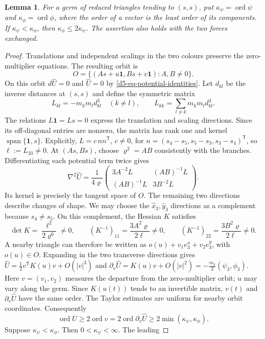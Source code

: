 \documentclass[11pt]{amsart}
\newtheorem{lemma}[theorem]{Lemma}
\theoremstyle{definition}
\theoremstyle{remark}
\newcommand{\ord}{\operatorname{ord}}
\begin{document}
{\begin{lemma}\label{d5-lem-mb}
For a germ of reduced triangles tending to $(s,s)$, put
$\kappa_\psi=\ord\psi$ and $\kappa_\phi=\ord\phi$, where the order of a vector is
the least order of its components.  If $\kappa_\psi<\kappa_\phi$, then
$\kappa_\phi\le2\kappa_\psi$.  The assertion also holds with the two forces
exchanged.
\end{lemma}
\begin{proof}
Translations and independent scalings in the two colours preserve the
zero-multiplier equations.  The resulting orbit is
\[
 O=\{(As+u\mathbf1,Bs+v\mathbf1):A,B\ne0\}.
\]
On this orbit $d\widehat U=0$ and $\widehat U=0$ by
\eqref{d5-eq-potential-identities}.  Let $d_{kl}$ be the inverse distances at
$(s,s)$ and define the symmetric matrix
\[
 L_{kl}=-m_km_ld_{kl}^3\quad(k\ne l),\qquad
 L_{kk}=\sum_{l\ne k}m_km_ld_{kl}^3.
\]
The relations $L\mathbf1=Ls=0$ express the translation and scaling
directions.  Since its off-diagonal entries are nonzero, the matrix has
rank one and kernel $\operatorname{span}\{\mathbf1,s\}$.  Explicitly,
$L=c\,nn^{\mathsf T}$, $c\ne0$, for
$n=(s_4-s_5,s_5-s_3,s_3-s_4)^{\mathsf T}$, so $\ell:=L_{33}\ne0$.
At $(As,Bs)$, choose $\varrho^2=AB$ consistently with the branches.  Differentiating
each potential term twice gives
\[
 \nabla^2\widehat U=\frac1{4\varrho}
 \begin{pmatrix}3A^{-2}L&(AB)^{-1}L\\(AB)^{-1}L&3B^{-2}L\end{pmatrix}.
\]
Its kernel is precisely the tangent space of $O$.  The remaining two
directions describe changes of shape.  We may choose the $\hat x_3,\hat y_3$
directions as a complement because $s_4\ne s_5$.  On this complement, the
Hessian $K$ satisfies
\[
 \det K=\frac{\ell^2}{2\varrho^6}\ne0,\qquad
 (K^{-1})_{11}=\frac{3A^2\varrho}{2\ell}\ne0,
 \qquad (K^{-1})_{22}=\frac{3B^2\varrho}{2\ell}\ne0.
\]
A nearby triangle can therefore be written as
$o(u)+v_1e_3^x+v_2e_3^y$, with $o(u)\in O$.
Expanding in the two transverse directions gives
$\widehat U=\frac12v^{\mathsf T}K(u)v+O(|v|^3)$ and
$\partial_v\widehat U=K(u)v+O(|v|^2)=-\frac{m_3}{2}(\psi_3,\phi_3)$.
Here $v=(v_1,v_2)$ measures the departure from the zero-multiplier orbit;
$u$ may vary along the germ.  Since $K(u(t))$ tends to an invertible matrix,
$v(t)$ and $\partial_v\widehat U$ have the same order.  The Taylor estimates
are uniform for nearby orbit coordinates.
Consequently
\[
 \ord\widehat U\ge2\ord v
 =2\ord\partial_v\widehat U\ge2\min(\kappa_\psi,\kappa_\phi).
\]
Suppose $\kappa_\psi<\kappa_\phi$.  Then $0<\kappa_\psi<\infty$.  The leading

\end{proof}}
\end{document}
